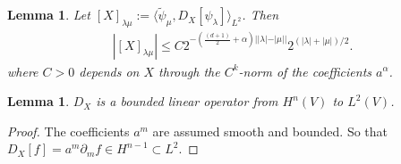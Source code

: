 \documentclass[letterpaper, 12 pt]{amsart}
\newtheorem{lem}[thm]{Lemma}
\begin{document}
\begin{lem} \label{lem:entry_bounds}
  Let $[X]_{\lambda\mu} := \langle \tilde{\psi}_\mu, D_X[\psi_\lambda] \rangle_{L^2}$.  Then
  \begin{align*}
    | [X]_{\lambda \mu} |\leq C 2^{- \left(\frac{(d+1)}{2}+ \alpha \right)| |\lambda| - |\mu| | }
    2^{( |\lambda | + |\mu|)/2}.
  \end{align*}
  where $C > 0$ depends on $X$ through the $C^k$-norm of the coefficients $a^\alpha$.
\end{lem}

\begin{lem} \label{lem:DX_is_bounded}
  $D_X$ is a bounded linear operator from $H^n(V)$ to $L^2(V)$.
\end{lem}
\begin{proof}
  The coefficients $a^m$ are assumed smooth and bounded.
  So that $D_X [f] = a^m \partial_m f \in H^{n-1} \subset L^2$.
\end{proof}
\end{document}
